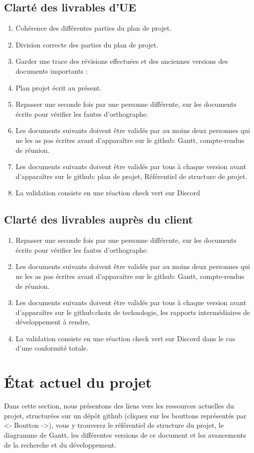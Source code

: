 \documentclass[11pt]{rapport_class}
\begin{document}
\section{Clarté des livrables d'UE}
\begin{enumerate}
    \item Cohérence des différentes parties du plan de projet.
    \item Division correcte des parties du plan de projet.
    \item Garder une trace des révisions effectuées et des anciennes versions des documents importants : 
    \item Plan projet écrit au présent.
    \item Repasser une seconde fois par une personne différente, sur les documents écrits pour vérifier les fautes d'orthographe.
    \item Les documents suivants doivent être validés par au moins deux personnes qui ne les as pas écrites avant d'apparaître sur le github: Gantt, compte-rendus de réunion.
    \item Les documents suivants doivent être validés par tous à chaque version avant d'apparaître sur le github: plan de projet, Référentiel de structure de projet.
    \item La validation consiste en une réaction check vert sur Discord
\end{enumerate}
\section{Clarté des livrables auprès du client}
\begin{enumerate}
    \item Repasser une seconde fois par une personne différente, sur les documents écrits pour vérifier les fautes d'orthographe.
    \item Les documents suivants doivent être validés par au moins deux personnes qui ne les as pas écrites avant d'apparaitre sur le github: Gantt, compte-rendus de réunion.
    \item Les documents suivants doivent être validés par tous à chaque version avant d'apparaître sur le github:choix de technologie, les rapports intermédiaires de développement à rendre,
    \item La validation consiste en une réaction check vert sur Discord dans le cas d'une conformité totale.
\end{enumerate}

\chapter{ État actuel du projet}
\qquad Dans cette section, nous présentons des liens vers les ressources actuelles du projet, structurées sur un dépôt github (cliquez sur les bouttons représentés par <- Boutton ->), vous y trouverez le référentiel de structure du projet, le diagramme de Gantt, les différentes versions de ce document et les avancements de la recherche et du développement.
\end{document}
